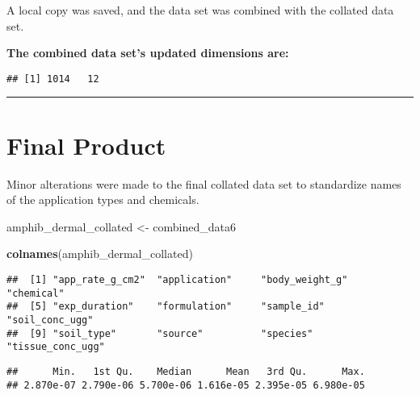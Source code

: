 \documentclass[
]{article}
\newenvironment{Shaded}{\begin{snugshade}}{\end{snugshade}}
\newcommand{\CommentTok}[1]{\textcolor[rgb]{0.56,0.35,0.01}{\textit{#1}}}
\newcommand{\KeywordTok}[1]{\textcolor[rgb]{0.13,0.29,0.53}{\textbf{#1}}}
\newcommand{\NormalTok}[1]{#1}
\newcommand{\OperatorTok}[1]{\textcolor[rgb]{0.81,0.36,0.00}{\textbf{#1}}}
\newcommand{\StringTok}[1]{\textcolor[rgb]{0.31,0.60,0.02}{#1}}
\begin{document}
A local copy was saved, and the data set was combined with the collated
data set.

\textbf{The combined data set's updated dimensions are:}

\begin{verbatim}
## [1] 1014   12
\end{verbatim}

\begin{center}\rule{0.5\linewidth}{0.5pt}\end{center}

\hypertarget{final-product}{%
\section{\texorpdfstring{\textbf{Final
Product}}{Final Product}}\label{final-product}}

Minor alterations were made to the final collated data set to
standardize names of the application types and chemicals.

\begin{Shaded}
\begin{Highlighting}[]
\NormalTok{amphib_dermal_collated <-}\StringTok{ }\NormalTok{combined_data6}

\KeywordTok{colnames}\NormalTok{(amphib_dermal_collated)}
\end{Highlighting}
\end{Shaded}

\begin{verbatim}
##  [1] "app_rate_g_cm2"  "application"     "body_weight_g"   "chemical"       
##  [5] "exp_duration"    "formulation"     "sample_id"       "soil_conc_ugg"  
##  [9] "soil_type"       "source"          "species"         "tissue_conc_ugg"
\end{verbatim}

\begin{Shaded}
\end{Shaded}

\begin{verbatim}
##      Min.   1st Qu.    Median      Mean   3rd Qu.      Max. 
## 2.870e-07 2.790e-06 5.700e-06 1.616e-05 2.395e-05 6.980e-05
\end{verbatim}

\begin{Shaded}
\end{Shaded}
\end{document}
